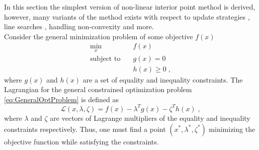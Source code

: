 In this section the simplest version of non-linear interior point method is derived, however, many variants of the method exists with respect to update strategies \cite{Byrd1997,Fiacco1990}, line searches \cite{Waltz2006,Wachter2005,Fletcher2002}, handling non-convexity \cite{Vanderbei1999} and more.\\
Consider the general minimization problem of some objective $f(x)$
\begin{subequations}	
 \begin{align}
	\min_{x } 			\quad & f(x) 			\\
	\text{subject to} 	\quad & g(x) = 0  		\\ 
						   	  & h(x) \geq 0 	\; ,
\end{align}
\label{eq:GeneralOptProblem}
\end{subequations}
where $g(x)$ and $h(x)$ are a set of equality and inequality constraints. The Lagrangian for the general constrained optimization problem \eqref{eq:GeneralOptProblem} is defined as
\begin{equation}
	\mathcal{L}(x,\lambda,\zeta) = f(x) - \lambda^T g(x) - \zeta^T h(x)  \; ,
\end{equation}
where $\lambda$ and $\zeta$ are vectors of Lagrange multipliers of the equality and inequality constraints respectively. Thus, one must find a point $(x^*,\lambda^*,\zeta^*)$ minimizing the objective function while satisfying the constraints.

